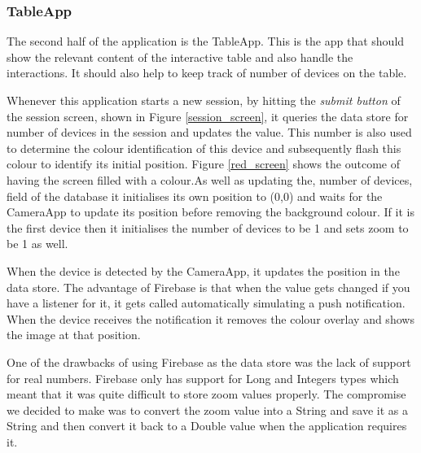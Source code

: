 \subsubsection{TableApp} \label{tableapp}

The second half of the application is the TableApp. This is the app that should show the relevant content  of the interactive table and also handle the interactions. It should also help to keep track of number of devices on the table.

Whenever this application starts a new session, by hitting the \emph{submit button} of the session screen, shown in Figure \ref{session_screen}, it queries the data store for number of devices in the session and updates the value. This number is also used to determine the colour identification of this device and subsequently flash this colour to identify its initial position. Figure \ref{red_screen} shows the outcome of having the screen filled with a colour.As well as updating the, number of devices, field of the database it initialises its own position to (0,0) and waits for the CameraApp to update its position before removing the background colour. If it is the first device then it initialises the number of devices to be 1 and sets zoom to be 1 as well.

When the device is detected by the CameraApp, it updates the position in the data store. The advantage of Firebase is that when the value gets changed if you have a listener for it, it gets called automatically simulating a push notification. When the device receives the notification it removes the colour overlay and shows the image at that position.

One of the drawbacks of using Firebase as the data store was the lack of support for real numbers. Firebase only has support for Long and Integers types which meant that it was quite difficult to store zoom values properly. The compromise we decided to make was to convert the zoom value into a String and save it as a String and then convert it back to a Double value when the application requires it.


